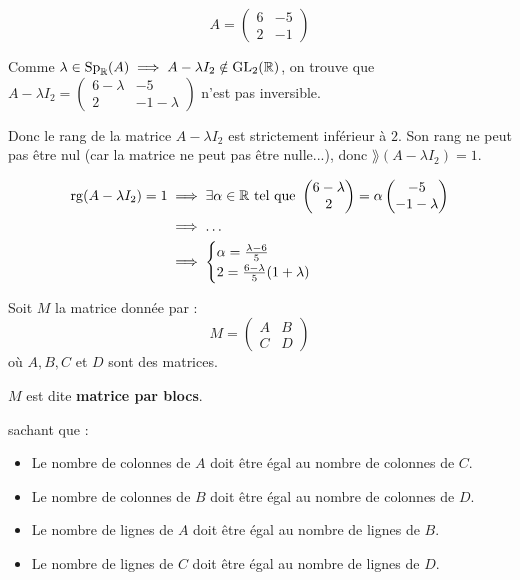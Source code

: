 \documentclass[12pt, a4paper]{report}
\begin{document}
\begin{example}
    $$A = \left(\begin{matrix} 6 & -5 \\ 2 & -1 \end{matrix}\right)$$

    Comme $\lambda \in \mathrm{Sp}_{\mathbb{R}}(A) \implies A - \lambda I_2 \notin \mathrm{GL}_2(\mathbb{R})$, on trouve que $A - \lambda I_2 = \left(\begin{matrix} 6 - \lambda & -5 \\ 2 & -1 - \lambda \end{matrix}\right)$ n'est pas inversible.

    Donc le rang de la matrice $A - \lambda I_2$ est strictement inférieur à $2$. Son rang ne peut pas être nul (car la matrice ne peut pas être nulle...), donc $\rang(A - \lambda I_2) = 1$.

    \begin{align*}
        \mathrm{rg}(A - \lambda I_2) = 1 & \implies \exists \alpha \in \mathbb{R} \text{ tel que } \left(\begin{matrix} 6 - \lambda \\ 2 \end{matrix}\right) = \alpha \left(\begin{matrix} -5 \\ -1 - \lambda \end{matrix}\right) \\
        & \implies \dots \\
        & \implies \begin{cases} \alpha = \frac{\lambda - 6}{5} \\ 2 = \frac{6 - \lambda}{5} (1 + \lambda) \end{cases} \\
    \end{align*}
\end{example}

\begin{definition}
    Soit $M$ la matrice donnée par :
    $$M = \left(\begin{matrix}
        A & B \\
        C & D
    \end{matrix}\right)$$
    où $A,B,C$ et $D$ sont des matrices.
    
    $M$ est dite \textbf{matrice par blocs}.

    sachant que :
    \begin{itemize}
        \item Le nombre de colonnes de $A$ doit être égal au nombre de colonnes de $C$.
        \item Le nombre de colonnes de $B$ doit être égal au nombre de colonnes de $D$.
        \item Le nombre de lignes de $A$ doit être égal au nombre de lignes de $B$.
        \item Le nombre de lignes de $C$ doit être égal au nombre de lignes de $D$.
    \end{itemize}
\end{definition}
\end{document}
